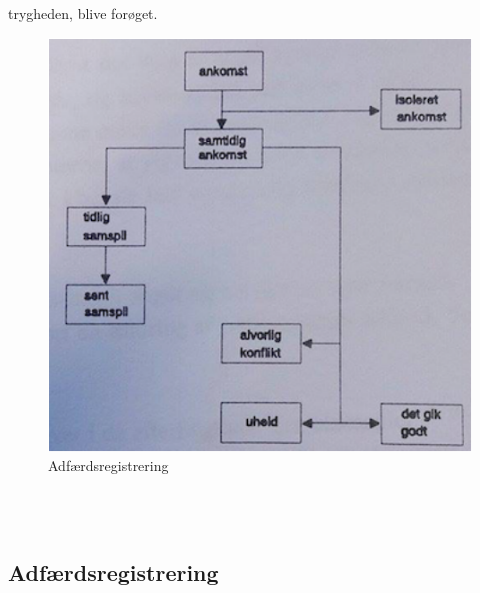 trygheden, blive forøget.
\begin{figure}[htbp]
  \label{fig:adfreg}
  \centering
  \begin{adjustbox}{max width=\textwidth}
    \includegraphics[scale=0.7]{billederogfigur/adfaerdsreg.png} %
 \end{adjustbox}
  \caption{Adfærdsregistrering}
\end{figure}
\\\
\subsection{Adfærdsregistrering}
\label{sub:adfregis}

